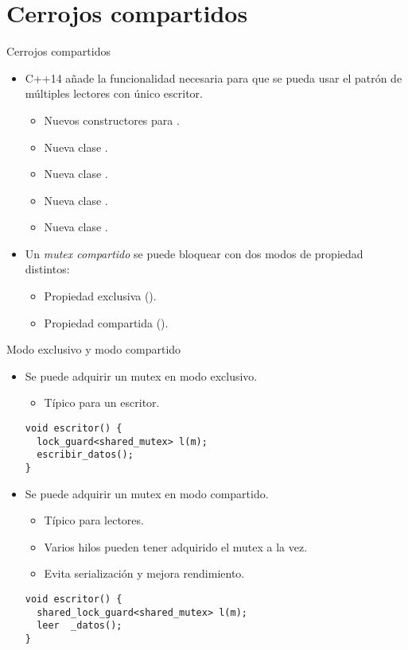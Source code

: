 \section{Cerrojos compartidos}

\begin{frame}{Cerrojos compartidos}
\begin{itemize}
  \item C++14 añade la funcionalidad necesaria para que se pueda usar el
        patrón de múltiples lectores con único escritor.
    \begin{itemize}
      \item Nuevos constructores para .
      \item Nueva clase .
      \item Nueva clase .
      \item Nueva clase .
      \item Nueva clase .
    \end{itemize}
  \item Un \emph{mutex compartido} se puede bloquear con dos modos de propiedad distintos:
    \begin{itemize}
      \item Propiedad exclusiva ().
      \item Propiedad compartida ().
    \end{itemize}
\end{itemize}
\end{frame}

\begin{frame}[fragile]{Modo exclusivo y modo compartido}
\begin{itemize}
  \item Se puede adquirir un mutex en modo exclusivo.
    \begin{itemize}
      \item Típico para un escritor.
    \end{itemize}
\begin{lstlisting}
void escritor() {
  lock_guard<shared_mutex> l(m);
  escribir_datos();
}
\end{lstlisting}
  \item Se puede adquirir un mutex en modo compartido.
    \begin{itemize}
      \item Típico para lectores.
      \item Varios hilos pueden tener adquirido el mutex a la vez.
      \item Evita serialización y mejora rendimiento.
    \end{itemize}
\begin{lstlisting}
void escritor() {
  shared_lock_guard<shared_mutex> l(m);
  leer	_datos();
}
\end{lstlisting}
\end{itemize}
\end{frame}

